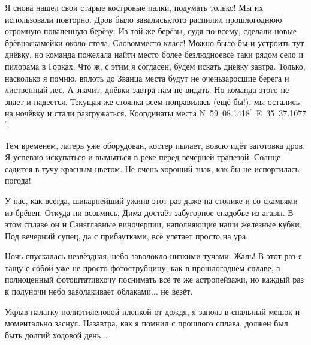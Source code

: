 Я снова нашел свои старые костровые палки, подумать только! Мы их использовали повторно. Дров было завались\mdash кто\sdash то распилил прошлогоднюю огромную поваленную берёзу. Из той же берёзы, судя по всему, сделали новые брёвна\sdash скамейки около стола. Словом\mdash место класс! Можно было бы и устроить тут днёвку, но команда пожелала найти место более безлюдное\mdash всё таки рядом село и пилорама в Горках. Что ж, с этим я согласен, будем искать днёвку завтра. Только, насколько я помню, вплоть до Званца места будут не очень\mdash заросшие берега и лиственный лес. А значит, днёвки завтра нам не видать. Но команда этого не знает и надеется. Текущая же стоянка всем понравилась (ещё бы!), мы остались на ночёвку и стали разгружаться. Координаты места N~59\degree~08.1418$^\prime$~E~35\degree~37.1077$^\prime$.

Тем временем, лагерь уже оборудован, костер пылает, вовсю идёт заготовка дров. Я успеваю искупаться и вымыться в реке перед вечерней трапезой. Солнце садится в тучу красным цветом. Не очень хороший знак, как бы не испортилась погода!  

У нас, как всегда, шикарнейший ужин\mdash в этот раз даже на столике и со скамьями из брёвен. Откуда ни возьмись, Дима достаёт забугорное снадобье из агавы. В этом сплаве он и Саня\mdash главные виночерпии, наполняющие наши железные кубки. Под вечерний супец, да с прибаутками, всё улетает просто на ура. 

Ночь спускалась незвёздная, небо заволокло низкими тучами. Жаль! В этот раз я тащу с собой уже не просто фотострубцину, как в прошлогоднем сплаве, а полноценный фотоштатив\mdash хочу поснимать всё те же астропейзажи, но каждый раз к полуночи небо заволакивает облаками$\ldots$ не везёт.

Укрыв палатку полиэтиленовой пленкой от дождя, я заполз в спальный мешок и моментально заснул. Назавтра, как я помнил с прошлого сплава, должен был быть долгий ходовой день$\ldots$ 

\begin{center}
\end{center}
